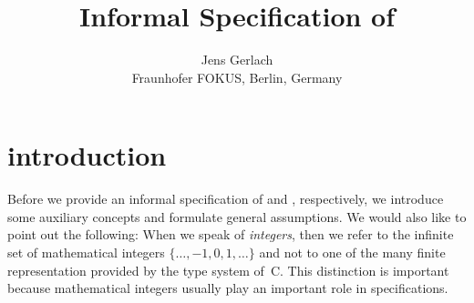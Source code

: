 \documentclass[paper=a4,DIV16,oneside,lefteqn]{scrartcl}
\title{Informal Specification of \bitwalker}
\author{Jens Gerlach\\
        {\small Fraunhofer FOKUS, Berlin, Germany}
       }
\date{}
\begin{document}
\maketitle

\section{introduction}

Before we provide an informal specification of \peek and \poke, respectively,
we introduce some auxiliary concepts and formulate general assumptions.
We would also like to point out the following:
When we speak of \emph{integers}, then we refer to the infinite set of mathematical
integers $\{\ldots, -1, 0, 1, \ldots\}$
and not to one of the many finite representation provided by the type system of~C.
This distinction is important because mathematical integers
usually play an important role in \acsl specifications.




\end{document}
